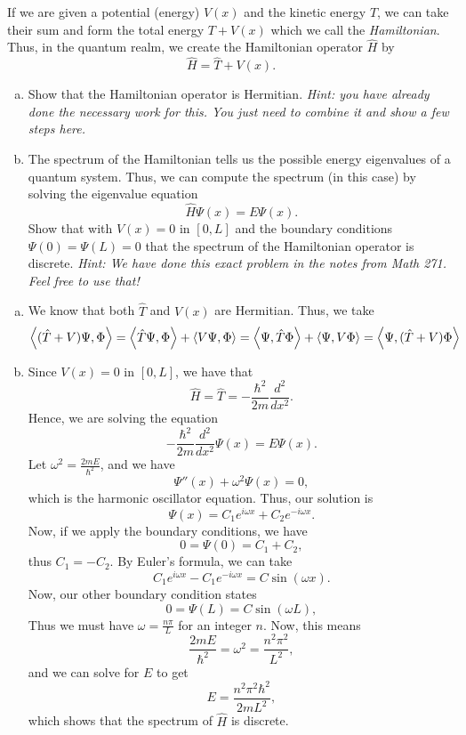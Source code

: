 \documentclass[12pt]{article} %
\begin{document}
\newpage
\begin{problem}
If we are given a potential (energy) $V(x)$ and the kinetic energy $T$, we can take their sum and form the total energy $T+V(x)$ which we call the \emph{Hamiltonian}.  Thus, in the quantum realm, we create the Hamiltonian operator $\hat{H}$ by
\[
\hat{H}=\hat{T}+V(x).
\]
\begin{enumerate}[(a)]
	\item Show that the Hamiltonian operator is Hermitian. \emph{Hint: you have already done the necessary work for this. You just need to combine it and show a few steps here.}
	\item The spectrum of the Hamiltonian tells us the possible energy eigenvalues of a quantum system. Thus, we can compute the spectrum (in this case) by solving the eigenvalue equation
	\[
	\hat{H}\Psi(x)=E\Psi(x).
	\]
	Show that with $V(x)=0$ in $[0,L]$ and the boundary conditions $\Psi(0)=\Psi(L)=0$ that the spectrum of the Hamiltonian operator is discrete.  \emph{Hint: We have done this exact problem in the notes from Math 271. Feel free to use that!}
\end{enumerate}
\end{problem}
\begin{solution}
	\begin{enumerate}[(a)]
		\item We know that both $\hat{T}$ and $V(x)$ are Hermitian.  Thus, we take
		\[
		\left\langle (\hat{T}+V)\Psi, \Phi \right\rangle = \left\langle \hat{T}\Psi, \Phi \right\rangle+\left\langle V\Psi, \Phi \right\rangle = \left\langle \Psi, \hat{T}\Phi \right\rangle+\left\langle \Psi, V\Phi \right\rangle = \left\langle \Psi, (\hat{T}+V)\Phi \right\rangle
		\]
		\item Since $V(x)=0$ in $[0,L]$, we have that
		\[
		\hat{H} = \hat{T} = -\frac{\hbar^2}{2m} \frac{d^2}{dx^2}.
		\]
		Hence, we are solving the equation
		\[
		-\frac{\hbar^2}{2m} \frac{d^2}{dx^2}\Psi(x) = E \Psi(x).
		\]
		Let $\omega^2 = \frac{2mE}{\hbar^2}$, and we have
		\[
		\Psi''(x) +\omega^2 \Psi(x) = 0,
		\]
		which is the harmonic oscillator equation.  Thus, our solution is
		\[
		\Psi(x) = C_1 e^{i\omega x}+C_2 e^{-i\omega x}.
		\]
		Now, if we apply the boundary conditions, we have
		\[
		0=\Psi(0)= C_1+C_2,
		\]
		thus $C_1=-C_2$. By Euler's formula, we can take
		\[
		C_1 e^{i\omega x}-C_1 e^{-i \omega x} = C \sin(\omega x).
		\]
		Now, our other boundary condition states
		\[
		0 = \Psi(L) = C\sin(\omega L),
		\]
		Thus we must have $\omega = \frac{n\pi}{L}$ for an integer $n$. Now, this means
		\[
		\frac{2mE}{\hbar^2}=\omega^2 = \frac{n^2\pi^2}{L^2},
		\]
		and we can solve for $E$ to get
		\[
		\boxed{E = \frac{n^2\pi^2\hbar^2}{2mL^2},}
		\]		
		which shows that the spectrum of $\hat{H}$ is discrete.
	\end{enumerate}
\end{solution}
\end{document}
